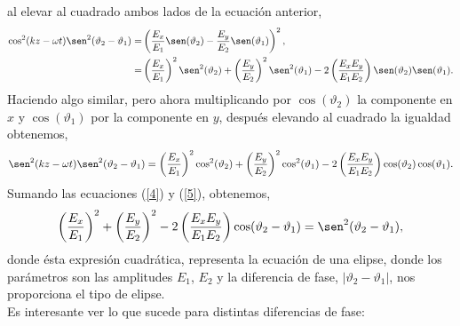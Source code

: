 \documentclass[11pt,fleqn]{book} %
\begin{document}
al elevar al cuadrado ambos lados de la ecuaci\'on anterior,
\begin{equation} \label{4}
\begin{split}
\cos^2(kz-\omega t)\sen^2(\vartheta_2-\vartheta_1)=&\left(\frac{E_x}{E_1}\sen(\vartheta_2)-\frac{E_y}{E_2}\sen(\vartheta_1)\right)^2,\\
=&\left( \frac{E_x}{E_1} \right)^{2}\sen^2(\vartheta_2)+\left( \frac{E_y}{E_2} \right)^{2}\sen^2(\vartheta_1)-2\left( \frac{E_x E_y}{E_1 E_2} \right)
\sen(\vartheta_2)\sen(\vartheta_1).\\
\end{split}
\end{equation}
Haciendo algo similar, pero ahora multiplicando por $\cos(\vartheta_2)$ la componente en $x$ y $\cos(\vartheta_1)$ por la componente en $y$, despu\'es
elevando al cuadrado la igualdad obtenemos,
\begin{equation} \label{5}
\sen^2(kz-\omega t)\sen^2(\vartheta_2-\vartheta_1)=\left( \frac{E_x}{E_1} \right)^{2}\cos^2(\vartheta_2)+\left( \frac{E_y}{E_2} \right)^{2}\cos^2(\vartheta_1)-2\left( \frac{E_x E_y}{E_1 E_2} \right)
\cos(\vartheta_2)\cos(\vartheta_1).
\end{equation}
Sumando las ecuaciones (\ref{4}) y (\ref{5}), obtenemos,
\begin{equation} \label{ec elipse}
\left( \frac{E_x}{E_1} \right)^{2}+\left( \frac{E_y}{E_2} \right)^{2}-2\left( \frac{E_x E_y}{E_1 E_2} \right)
\cos(\vartheta_2-\vartheta_1)=\sen^2(\vartheta_2-\vartheta_1),
\end{equation}
donde \'esta expresi\'on cuadr\'atica, representa la ecuaci\'on de una elipse, donde los par\'ametros son las amplitudes $E_1$, $E_2$ y
la diferencia de fase, $|\vartheta_2-\vartheta_1|$, nos proporciona el tipo de elipse.\\
Es interesante ver lo que sucede para distintas diferencias de fase:\\
\end{document}

